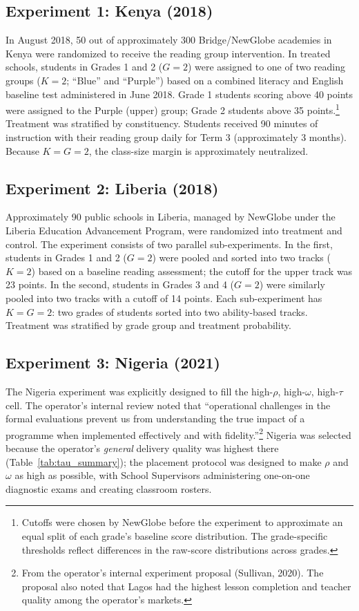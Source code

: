 \documentclass[11pt]{article}
\begin{document}
\subsection{Experiment 1: Kenya (2018)}

In August 2018, 50 out of approximately 300 Bridge/NewGlobe academies in Kenya were randomized to receive the reading group intervention. In treated schools, students in Grades 1 and 2 ($G = 2$) were assigned to one of two reading groups ($K = 2$; ``Blue'' and ``Purple'') based on a combined literacy and English baseline test administered in June 2018. Grade 1 students scoring above 40 points were assigned to the Purple (upper) group; Grade 2 students above 35 points.\footnote{Cutoffs were chosen by NewGlobe before the experiment to approximate an equal split of each grade's baseline score distribution. The grade-specific thresholds reflect differences in the raw-score distributions across grades.} Treatment was stratified by constituency. Students received 90 minutes of instruction with their reading group daily for Term 3 (approximately 3 months). Because $K = G = 2$, the class-size margin is approximately neutralized.

\subsection{Experiment 2: Liberia (2018)}

Approximately 90 public schools in Liberia, managed by NewGlobe under the Liberia Education Advancement Program, were randomized into treatment and control. The experiment consists of two parallel sub-experiments. In the first, students in Grades 1 and 2 ($G = 2$) were pooled and sorted into two tracks ($K = 2$) based on a baseline reading assessment; the cutoff for the upper track was 23 points. In the second, students in Grades 3 and 4 ($G = 2$) were similarly pooled into two tracks with a cutoff of 14 points. Each sub-experiment has $K = G = 2$: two grades of students sorted into two ability-based tracks. Treatment was stratified by grade group and treatment probability.

\subsection{Experiment 3: Nigeria (2021)}

The Nigeria experiment was explicitly designed to fill the high-$\rho$, high-$\omega$, high-$\tau$ cell. The operator's internal review noted that ``operational challenges in the formal evaluations prevent us from understanding the true impact of a programme when implemented effectively and with fidelity.''\footnote{From the operator's internal experiment proposal (Sullivan, 2020). The proposal also noted that Lagos had the highest lesson completion and teacher quality among the operator's markets.} Nigeria was selected because the operator's \emph{general} delivery quality was highest there (Table~\ref{tab:tau_summary}); the placement protocol was designed to make $\rho$ and $\omega$ as high as possible, with School Supervisors administering one-on-one diagnostic exams and creating classroom rosters.
\end{document}
